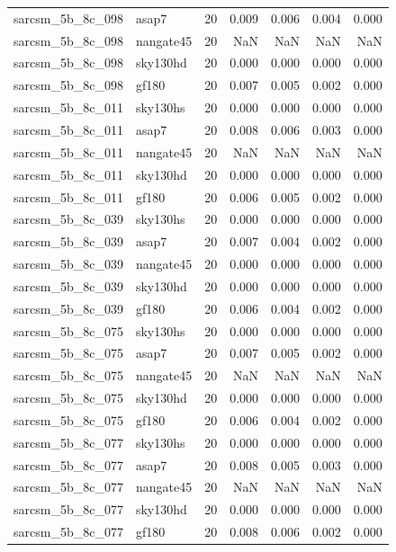 \begin{tabular}{llrrrrr}
sarcsm\_5b\_8c\_098 & asap7 & 20 & 0.009 & 0.006 & 0.004 & 0.000 \\
sarcsm\_5b\_8c\_098 & nangate45 & 20 & NaN & NaN & NaN & NaN \\
sarcsm\_5b\_8c\_098 & sky130hd & 20 & 0.000 & 0.000 & 0.000 & 0.000 \\
sarcsm\_5b\_8c\_098 & gf180 & 20 & 0.007 & 0.005 & 0.002 & 0.000 \\
sarcsm\_5b\_8c\_011 & sky130hs & 20 & 0.000 & 0.000 & 0.000 & 0.000 \\
sarcsm\_5b\_8c\_011 & asap7 & 20 & 0.008 & 0.006 & 0.003 & 0.000 \\
sarcsm\_5b\_8c\_011 & nangate45 & 20 & NaN & NaN & NaN & NaN \\
sarcsm\_5b\_8c\_011 & sky130hd & 20 & 0.000 & 0.000 & 0.000 & 0.000 \\
sarcsm\_5b\_8c\_011 & gf180 & 20 & 0.006 & 0.005 & 0.002 & 0.000 \\
sarcsm\_5b\_8c\_039 & sky130hs & 20 & 0.000 & 0.000 & 0.000 & 0.000 \\
sarcsm\_5b\_8c\_039 & asap7 & 20 & 0.007 & 0.004 & 0.002 & 0.000 \\
sarcsm\_5b\_8c\_039 & nangate45 & 20 & 0.000 & 0.000 & 0.000 & 0.000 \\
sarcsm\_5b\_8c\_039 & sky130hd & 20 & 0.000 & 0.000 & 0.000 & 0.000 \\
sarcsm\_5b\_8c\_039 & gf180 & 20 & 0.006 & 0.004 & 0.002 & 0.000 \\
sarcsm\_5b\_8c\_075 & sky130hs & 20 & 0.000 & 0.000 & 0.000 & 0.000 \\
sarcsm\_5b\_8c\_075 & asap7 & 20 & 0.007 & 0.005 & 0.002 & 0.000 \\
sarcsm\_5b\_8c\_075 & nangate45 & 20 & NaN & NaN & NaN & NaN \\
sarcsm\_5b\_8c\_075 & sky130hd & 20 & 0.000 & 0.000 & 0.000 & 0.000 \\
sarcsm\_5b\_8c\_075 & gf180 & 20 & 0.006 & 0.004 & 0.002 & 0.000 \\
sarcsm\_5b\_8c\_077 & sky130hs & 20 & 0.000 & 0.000 & 0.000 & 0.000 \\
sarcsm\_5b\_8c\_077 & asap7 & 20 & 0.008 & 0.005 & 0.003 & 0.000 \\
sarcsm\_5b\_8c\_077 & nangate45 & 20 & NaN & NaN & NaN & NaN \\
sarcsm\_5b\_8c\_077 & sky130hd & 20 & 0.000 & 0.000 & 0.000 & 0.000 \\
sarcsm\_5b\_8c\_077 & gf180 & 20 & 0.008 & 0.006 & 0.002 & 0.000 \\

\end{tabular}

